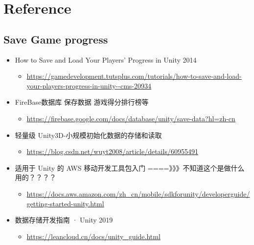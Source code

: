 \documentclass[9pt, b5paper]{article}
\begin{document}
\section{Reference}
\label{sec-3}
\subsection{Save Game progress}
\label{sec-3-1}
\begin{itemize}
\item How to Save and Load Your Players' Progress in Unity 2014
\begin{itemize}
\item \url{https://gamedevelopment.tutsplus.com/tutorials/how-to-save-and-load-your-players-progress-in-unity--cms-20934}
\end{itemize}
\item FireBase数据库 保存数据 游戏得分排行榜等
\begin{itemize}
\item \url{https://firebase.google.com/docs/database/unity/save-data?hl=zh-cn}
\end{itemize}
\item 轻量级 Unity3D-小规模初始化数据的存储和读取
\begin{itemize}
\item \url{https://blog.csdn.net/wuyt2008/article/details/60955491}
\end{itemize}
\item 适用于 Unity 的 AWS 移动开发工具包入门  ====》》》不知道这个是做什么用的？？？？
\begin{itemize}
\item \url{https://docs.aws.amazon.com/zh_cn/mobile/sdkforunity/developerguide/getting-started-unity.html}
\end{itemize}
\item 数据存储开发指南 · Unity 2019
\begin{itemize}
\item \url{https://leancloud.cn/docs/unity_guide.html}
\end{itemize}
\end{itemize}
\end{document}
